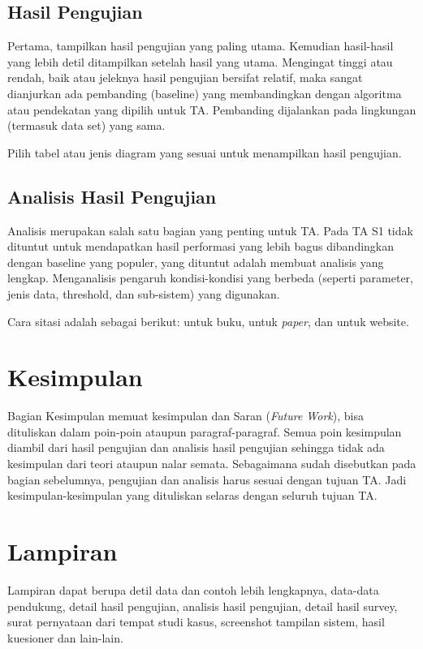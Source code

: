 \subsection{Hasil Pengujian}

Pertama, tampilkan hasil pengujian yang paling utama. Kemudian hasil-hasil yang lebih detil ditampilkan setelah hasil yang utama. Mengingat tinggi atau rendah, baik atau jeleknya hasil pengujian bersifat relatif, maka sangat dianjurkan ada pembanding (baseline) yang membandingkan dengan algoritma atau pendekatan yang dipilih untuk TA. Pembanding dijalankan pada lingkungan (termasuk data set) yang sama.

Pilih tabel atau jenis diagram yang sesuai untuk menampilkan hasil pengujian. 


\subsection{Analisis Hasil Pengujian}
 Analisis merupakan salah satu bagian yang penting untuk TA. Pada TA S1 tidak dituntut untuk mendapatkan hasil performasi yang lebih bagus dibandingkan dengan baseline yang populer, yang dituntut adalah membuat analisis yang lengkap. Menganalisis pengaruh kondisi-kondisi yang berbeda (seperti parameter, jenis data, threshold, dan sub-sistem) yang digunakan. 
 
 Cara sitasi adalah sebagai berikut: \citep{van2002fundamentals} untuk buku, \citep{ochoa2003hybrid} untuk \textit{paper}, dan \citep{Budi} untuk website.
   
   
\section{Kesimpulan}
 \noindent Bagian Kesimpulan memuat kesimpulan dan Saran (\textit{Future Work}), bisa dituliskan dalam poin-poin ataupun paragraf-paragraf. Semua poin kesimpulan diambil dari hasil pengujian dan analisis hasil pengujian sehingga tidak ada kesimpulan dari teori ataupun nalar semata. Sebagaimana sudah disebutkan pada bagian sebelumnya, pengujian dan analisis harus sesuai dengan tujuan TA. Jadi kesimpulan-kesimpulan yang dituliskan selaras dengan seluruh tujuan TA. 
 





\section*{Lampiran}

\noindent Lampiran dapat berupa detil data dan contoh lebih lengkapnya, data-data pendukung, detail hasil pengujian, analisis hasil pengujian, detail hasil survey, surat pernyataan dari tempat studi kasus, screenshot tampilan sistem, hasil kuesioner dan lain-lain.